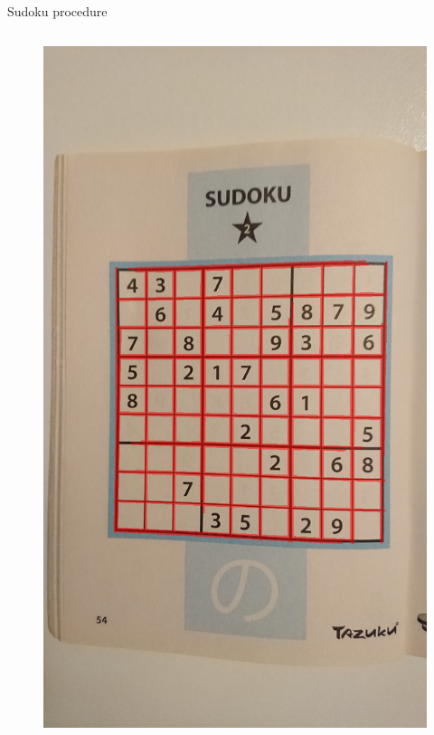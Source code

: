 \documentclass[12pt]{beamer}
\begin{document}
\begin{frame}{Sudoku procedure}
\begin{columns}
{\begin{figure}
            \includegraphics[width=\textwidth]{resources/png/sudoku_00018_04.png}
        \end{figure}
    }
    \end{columns}
\end{frame}
\end{document}

